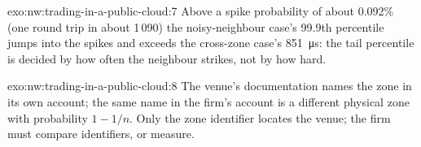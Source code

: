 \begin{solution}{exo:nw:trading-in-a-public-cloud:7}
Above a spike probability of about 0.092\% (one round trip in about 1\,090) the noisy-neighbour case's 99.9th percentile jumps into the spikes and exceeds
the cross-zone case's \qty{851}{\micro\second}: the tail percentile is decided by how often the neighbour strikes, not by how hard.
\end{solution}

\begin{solution}{exo:nw:trading-in-a-public-cloud:8}
The venue's documentation names the zone in its own account; the same name in the firm's account is a different physical zone with probability
$1 - 1/n$. Only the zone identifier locates the venue; the firm must compare identifiers, or measure.
\end{solution}

